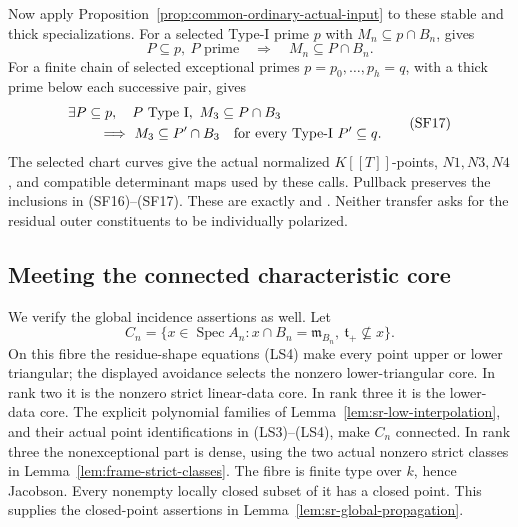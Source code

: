 Now apply Proposition~\ref{prop:common-ordinary-actual-input}
to these stable and thick specializations.
For a selected Type-I prime \(p\) with
\(M_n\subseteq p\cap B_n\),  gives
\[
 P\subseteq p,\ P\text{ prime}
                 \quad\Longrightarrow\quad
                          M_n\subseteq P\cap B_n .         \tag{SF16}
\]
For a finite chain of selected exceptional primes
\(p=p_0,\ldots,p_h=q\), with a thick prime below
each successive pair,  gives
\[
 \begin{split}
 &\exists P\subseteq p,\quad P\text{ Type I},\
                               M_3\subseteq P\cap B_3\\
 &\hspace{8mm}\Longrightarrow\
 M_3\subseteq P'\cap B_3
       \quad\text{for every Type-I }P'\subseteq q .
 \end{split}                                                \tag{SF17}
\]
The selected chart curves give the actual normalized
\(K[[T]]\)-points, \(N1,N3,N4\), and compatible
determinant maps used by these calls.
Pullback preserves the inclusions in (SF16)--(SF17).
These are exactly \srcid{P1'} and .
Neither transfer asks for the residual outer
constituents to be individually polarized.

\subsection{Meeting the connected characteristic core}
We verify the global incidence assertions as well.
Let
\[
 C_n=\{x\in\operatorname{Spec}A_n:
          x\cap B_n=\mathfrak m_{B_n},\
                          \mathfrak t_+\not\subseteq x\}.
\]
On this fibre the residue-shape equations (LS4)
make every point upper or lower triangular;
the displayed avoidance selects the nonzero
lower-triangular core.
In rank two it is the nonzero strict linear-data
core. In rank three it is the lower-data core.
The explicit polynomial families of
Lemma~\ref{lem:sr-low-interpolation}, and their
actual point identifications in (LS3)--(LS4),
make \(C_n\) connected.
In rank three the nonexceptional part is dense,
using the two actual nonzero strict classes in
Lemma~\ref{lem:frame-strict-classes}.
The fibre is finite type over \(k\), hence
Jacobson. Every nonempty locally closed subset
of it has a closed point. This supplies the
closed-point assertions in
Lemma~\ref{lem:sr-global-propagation}.

